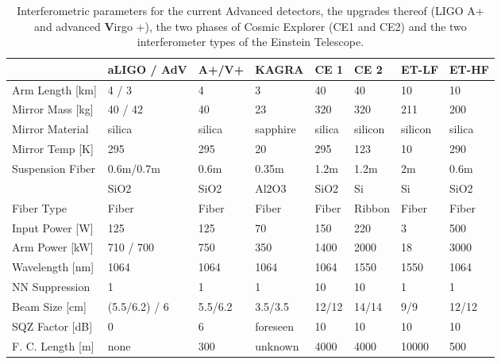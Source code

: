 \begin{table}[h]
\centering
\begin{tabular}{|l|l|l|p{1.6cm}|l|l|l|l|}
\hline
 &aLIGO / AdV &A+/V+ &KAGRA &CE 1 &CE 2 &ET-LF &ET-HF\\
\hline
Arm Length [km] & 4 / 3 &4& 3& 40& 40& 10 &10\\
\hline
Mirror Mass [kg]& 40 / 42& 40& 23& 320& 320& 211& 200\\
\hline
Mirror Material& silica& silica& sapphire& silica& silicon& silicon& silica\\
\hline
Mirror Temp [K]& 295& 295& 20& 295& 123& 10& 290\\
\hline
Suspension Fiber& 0.6m/0.7m& 0.6m& 0.35m& 1.2m& 1.2m& 2m& 0.6m\\
& SiO2& SiO2&Al2O3&SiO2&Si&Si&SiO2\\
\hline
Fiber Type& Fiber& Fiber& Fiber& Fiber& Ribbon& Fiber& Fiber\\
\hline
Input Power [W]& 125& 125& 70& 150& 220& 3& 500\\
\hline
Arm Power [kW]& 710 / 700& 750& 350& 1400& 2000& 18& 3000\\
\hline
Wavelength [nm]& 1064& 1064& 1064& 1064& 1550& 1550& 1064\\
\hline
NN Suppression& 1& 1& 1& 10& 10& 1& 1\\
\hline
Beam Size [cm]& (5.5/6.2) / 6& 5.5/6.2& 3.5/3.5& 12/12& 14/14& 9/9& 12/12\\
\hline
SQZ Factor [dB]& 0& 6& foreseen& 10& 10& 10& 10\\
\hline
F. C. Length [m]& none& 300& unknown& 4000& 4000& 10000& 500\\
\hline
\end{tabular}
\caption{Interferometric parameters for the current Advanced detectors, the upgrades thereof (LIGO A+ and advanced {\bf V}irgo +), the two phases of Cosmic Explorer (CE1 and CE2) and the two interferometer types of the Einstein Telescope.}
\label{Tab:FutIfos}
\end{table}

